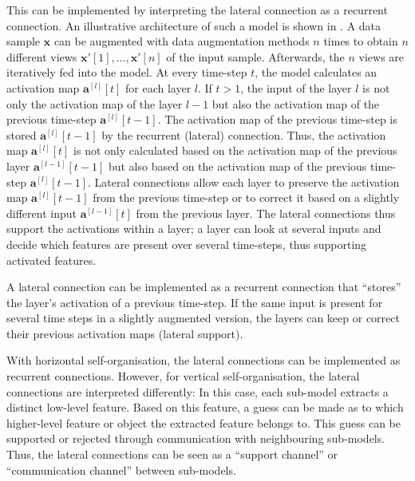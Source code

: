 This can be implemented by interpreting the lateral connection as a recurrent connection.
An illustrative architecture of such a model is shown in .
A data sample $\boldsymbol{x}$ can be augmented with data augmentation methods $n$ times to obtain $n$ different views $\boldsymbol{x}'[1], ..., \boldsymbol{x}'[n]$ of the input sample.
Afterwards, the $n$ views are iteratively fed into the model.
At every time-step $t$, the model calculates an activation map $\boldsymbol{a}^{[l]}[t]$ for each layer $l$.
If $t>1$, the input of the layer $l$ is not only the activation map of the layer $l-1$ but also the activation map of the previous time-step $\boldsymbol{a}^{[l]}[t-1]$.
The activation map of the previous time-step is stored $\boldsymbol{a}^{[l]}[t-1]$ by the recurrent (lateral) connection.
Thus, the activation map $\boldsymbol{a}^{[l]}[t]$ is not only calculated based on the activation map of the previous layer $\boldsymbol{a}^{[l-1]}[t-1]$ but also based on the activation map of the previous time-step $\boldsymbol{a}^{[l]}[t-1]$.
Lateral connections allow each layer to preserve the activation map $\boldsymbol{a}^{[l]}[t-1]$ from the previous time-step or to correct it based on a slightly different input $\boldsymbol{a}^{[l-1]}[t]$ from the previous layer. The lateral connections thus support the activations within a layer; a layer can look at several inputs and decide which features are present over several time-steps, thus supporting activated features.

\begin{implementation}
	A lateral connection can be implemented as a recurrent connection that ``stores'' the layer's activation of a previous time-step.
	If the same input is present for several time steps in a slightly augmented version, the layers can keep or correct their previous activation maps (lateral support).
\end{implementation}

With horizontal self-organisation, the lateral connections can be implemented as recurrent connections.
However, for vertical self-organisation, the lateral connections are interpreted differently:
In this case, each sub-model extracts a distinct low-level feature.
Based on this feature, a guess can be made as to which higher-level feature or object the extracted feature belongs to.
This guess can be supported or rejected through communication with neighbouring sub-models.
Thus, the lateral connections can be seen as a ``support channel'' or ``communication channel'' between sub-models. 

